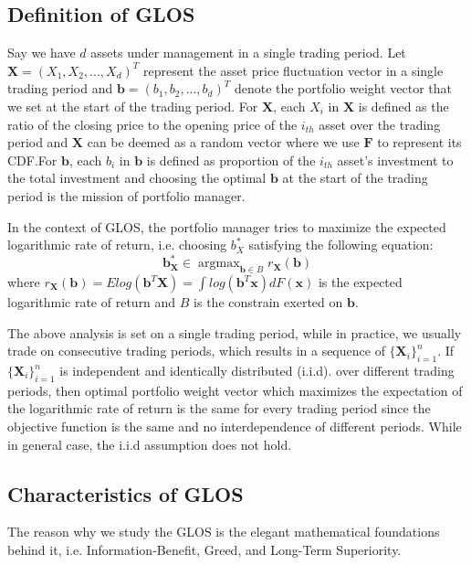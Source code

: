\documentclass{gapd}
\begin{document}
\subsection{Definition of GLOS}
\label{sec:Counteraxeample}

Say we have $d$ assets under management in a single trading period. Let $\textbf{X}=(X_1,X_2,...,X_d)^T$ represent the asset price fluctuation vector in a single trading period and $\textbf{b}=(b_1,b_2,...,b_d)^T$ denote the portfolio weight vector that we set at the start of the trading period. For $\textbf{X}$, each $X_i$ in $\textbf{X}$ is defined as the ratio of the closing price to the opening price of the $i_{th}$ asset over the trading period and $\textbf{X}$ can be deemed as a random vector where we use $\textbf{F}$ to represent its CDF.For $\textbf{b}$, each $b_i$ in $\textbf{b}$ is defined as proportion of the $i_{th}$ asset's investment to the total investment and choosing the optimal $\textbf{b}$ at the start of the trading period is the mission of portfolio manager. 

 In the context of GLOS, the portfolio manager tries to maximize the expected logarithmic rate of return, i.e. choosing $b_X^*$ satisfying the following equation:
 \begin{equation}
\mathbf{b_X^*}\in \mathop{\arg\max}_{\textbf{b}\in B}r_{\textbf{X}}(\textbf{b})
 \end{equation}
 where $r_{\textbf{X}}(\textbf{b})=Elog(\textbf{b}^T\textbf{X})=\int{log(\textbf{b}^T\textbf{x})dF(\textbf{x})}$ is the expected logarithmic rate of return and $B$ is the constrain exerted on $\textbf{b}$.

 The above analysis is set on a single trading period, while in practice, we usually trade on consecutive trading periods, which results in a sequence of $\{\textbf{X}_i\}_{i=1}^n$. If $\{\textbf{X}_i\}_{i=1}^n$ is independent and identically distributed (i.i.d). over different trading periods, then optimal portfolio weight vector which maximizes the expectation of the logarithmic rate of return is the same for every trading period since the objective function is the same and no interdependence of different periods. While in general case, the i.i.d assumption does not hold. 

\subsection{Characteristics of GLOS}
\label{sec:Conclusion}

The reason why we study the GLOS is the elegant mathematical foundations behind it, i.e. Information-Benefit, Greed, and Long-Term Superiority.
\end{document}
